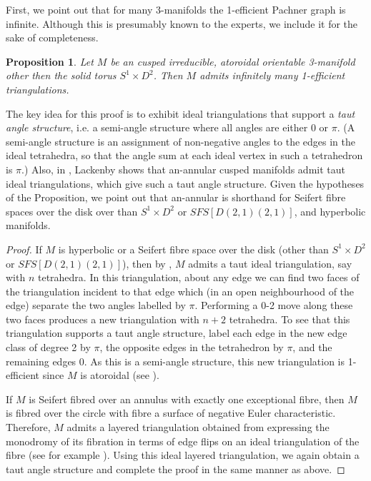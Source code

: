 \documentclass[12pt,reqno]{amsart}  %
\newtheorem{prop}[thm]{Proposition}
\theoremstyle{definition}
\theoremstyle{remark}
\begin{document}
First, we point out that for many 3-manifolds 
the 1-efficient Pachner graph is infinite. Although this is presumably 
known to the experts, we include it for the sake of completeness. 

\begin{prop}
Let $M$ be an cusped irreducible, atoroidal orientable 3-manifold other 
then the solid torus  $S^1\times D^2$. Then $M$ admits infinitely many 
1-efficient triangulations.
\end{prop}

The key idea for this proof is to exhibit ideal triangulations that 
support a {\em taut angle structure}, i.e.
a semi-angle structure where all angles are either 0 or $\pi$. 
(A semi-angle structure is an assignment of non-negative angles to the 
edges in the ideal tetrahedra, so that the angle sum at each ideal vertex 
in such a tetrahedron is $\pi$.)
Also, in \cite[Theorem 1]{La1}, Lackenby shows that an-annular cusped 
manifolds  admit taut ideal triangulations,
 which give such a  taut angle structure.
Given the hypotheses of the Proposition, we point out that an-annular is 
shorthand for Seifert fibre spaces over the disk 
over than $S^1\times D^2$ or $SFS[D(2,1)(2,1)]$, and hyperbolic manifolds. 

\begin{proof}
If $M$ is hyperbolic or a Seifert fibre space over the disk (other than 
$S^1\times D^2$ or $SFS[D(2,1)(2,1)]$), then by \cite[Theorem 1]{La1}, 
$M$ admits a taut ideal triangulation, say with $n$ tetrahedra. 
In this triangulation, about any edge we can find two faces of the 
triangulation incident 
to that edge which (in an open neighbourhood of the edge) separate the 
two angles labelled by $\pi$. Performing a 0-2 move along these two 
faces produces a new triangulation with $n+2$ tetrahedra. To see that 
this triangulation supports a taut angle structure, label each edge in the 
new edge class of degree 2 by $\pi$, the opposite edges in the tetrahedron 
by $\pi$, and the remaining edges $0$. As this is a semi-angle 
structure, this new triangulation is 1-efficient since $M$ is atoroidal 
(see \cite[Theorem 2.6]{KR2}). 

If $M$ is Seifert fibred over an annulus with exactly one exceptional 
fibre, then $M$ is fibred over the circle with fibre a surface of negative 
Euler characteristic. Therefore, $M$ admits a layered triangulation 
obtained from expressing the monodromy of its fibration in terms of edge 
flips on an ideal triangulation of the fibre (see for example 
\cite[Section 2]{La1}). Using this ideal layered triangulation, we again 
obtain a taut angle structure and complete the proof in the same manner 
as above. 
\end{proof}
\end{document}
